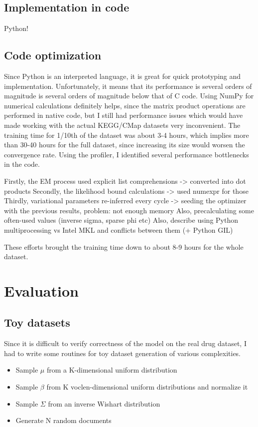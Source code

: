 \documentclass[12pt,a4paper,twoside,openright]{report}
\begin{document}
\section{Implementation in code}

Python!

\section{Code optimization}

Since Python is an interpreted language, it is great for quick prototyping and implementation. Unfortunately, it means that its performance is several orders of magnitude is several orders of magnitude below that of C code. Using NumPy for numerical calculations definitely helps, since the matrix product operations are performed in native code, but I still had performance issues which would have made working with the actual KEGG/CMap datasets very inconvenient. The training time for 1/10th of the dataset was about 3-4 hours, which implies more than 30-40 hours for the full dataset, since increasing its size would worsen the convergence rate. Using the profiler, I identified several performance bottlenecks in the code.

Firstly, the EM process used explicit list comprehensions -> converted into dot products
Secondly, the likelihood bound calculations -> used numexpr for those
Thirdly, variational parameters re-inferred every cycle -> seeding the optimizer with the previous results, problem: not enough memory
Also, precalculating some often-used values (inverse sigma, sparse phi etc)
Also, describe using Python multiprocessing vs Intel MKL and conflicts between them (+ Python GIL)

These efforts brought the training time down to about 8-9 hours for the whole dataset.

\chapter{Evaluation}

\section{Toy datasets}

Since it is difficult to verify correctness of the model on the real drug dataset, I had to write some routines for toy dataset generation of various complexities.

\begin{itemize}
\item Sample $\mu$ from a K-dimensional uniform distribution
\item Sample $\beta$ from K voclen-dimensional uniform distributions and normalize it
\item Sample $\Sigma$ from an inverse Wishart distribution
\item Generate N random documents
\end{itemize}
\end{document}
